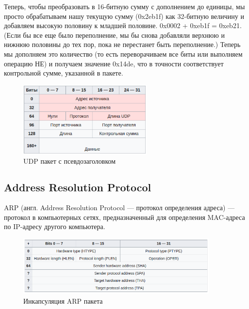 Теперь, чтобы преобразовать в 16-битную сумму с дополнением до единицы, мы просто обрабатываем нашу текущую сумму (0x2eb1f) как 32-битную величину и добавляем высокую половину к младшей половине. 0x0002 + 0xeb1f = 0xeb21. (Если бы все еще было переполнение, мы бы снова добавляли верхнюю и нижнюю половины до тех пор, пока не перестанет быть переполнение.) Теперь мы дополняем это количество (то есть переворачиваем все биты или выполняем операцию НЕ) и получаем значение 0x14de, что в точности соответствует контрольной сумме, указанной в пакете.

\begin{figure}[h]
	\centering
	\includegraphics[width=0.6\textwidth]{image/pheader}
	\caption{UDP пакет с псевдозаголовком}
	\label{UDP_pheader}
\end{figure}


\subsection{Address Resolution Protocol}
ARP (англ. Address Resolution Protocol — протокол определения адреса) — протокол в компьютерных сетях, предназначенный для определения MAC-адреса по IP-адресу другого компьютера.

\begin{figure}[h]
	\centering
	\includegraphics[width=0.9\textwidth]{image/ARP}
	\caption{Инкапсуляция ARP пакета}
	\label{INC_ARP}
\end{figure}

